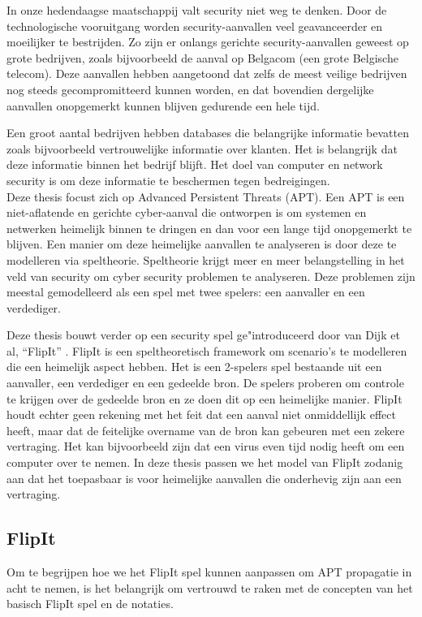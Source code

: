 \documentclass[master=cws, masteroption=vs,english]{kulemt}
\begin{document}
\begin{abstract*}
In onze hedendaagse maatschappij valt security niet weg te denken.  Door de technologische vooruitgang worden security-aanvallen veel geavanceerder en moeilijker te bestrijden. Zo zijn er onlangs gerichte security-aanvallen geweest op grote bedrijven, zoals bijvoorbeeld de aanval op Belgacom (een grote Belgische telecom). Deze aanvallen hebben aangetoond dat zelfs de meest veilige
bedrijven nog steeds gecompromitteerd kunnen worden, en dat bovendien dergelijke aanvallen onopgemerkt kunnen blijven gedurende een hele tijd. 

Een groot aantal bedrijven hebben databases die belangrijke informatie bevatten zoals bijvoorbeeld vertrouwelijke informatie over klanten. Het is belangrijk dat deze informatie binnen het bedrijf blijft. Het doel van computer en network security is om deze informatie te beschermen tegen bedreigingen. \\
Deze thesis focust zich op Advanced Persistent Threats (APT). Een APT is een niet-aflatende en gerichte cyber-aanval die ontworpen is om systemen en netwerken heimelijk binnen te dringen en dan voor een lange tijd onopgemerkt te blijven. Een manier om deze heimelijke aanvallen te analyseren is door deze te modelleren via speltheorie. Speltheorie krijgt meer en meer belangstelling in het veld van security om cyber security problemen te analyseren. Deze problemen zijn meestal gemodelleerd als een spel met twee spelers: een aanvaller en een verdediger. 


Deze thesis bouwt verder op een security spel ge"introduceerd door van Dijk et al, ``FlipIt'' \citep{FlipIt}.
FlipIt is een speltheoretisch framework om scenario's te modelleren die een heimelijk aspect hebben. Het is een 2-spelers spel bestaande uit een aanvaller, een verdediger en een gedeelde bron.  De spelers proberen om controle te krijgen over de gedeelde bron en ze
doen dit op een heimelijke manier. FlipIt houdt echter geen rekening met het feit dat een aanval niet onmiddellijk effect heeft, maar dat de feitelijke overname van de bron kan gebeuren met een zekere vertraging. Het kan bijvoorbeeld zijn dat een virus even tijd nodig heeft om een computer over te nemen. In deze thesis passen we het model van FlipIt zodanig aan dat het toepasbaar is voor heimelijke aanvallen die onderhevig zijn aan een vertraging.
 \\

\subsection{FlipIt}
Om te begrijpen hoe we het FlipIt spel kunnen aanpassen om APT propagatie in acht te nemen, is het belangrijk om vertrouwd te raken met de concepten van het basisch FlipIt spel en de notaties.  \\


\end{abstract*}
\end{document}
